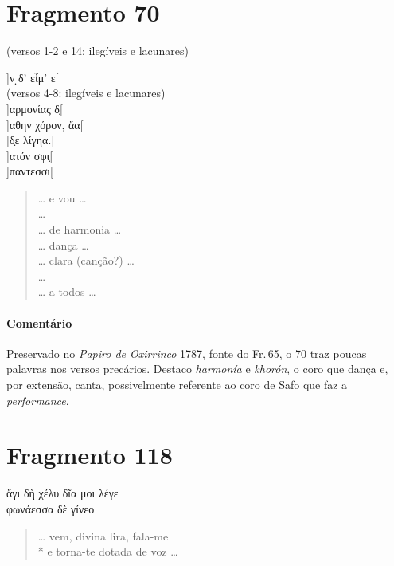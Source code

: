 \section{Fragmento 70}

\begin{gkverse}
\textnormal{(versos 1-2 e 14: ilegíveis e lacunares)}

]ν ̣δ’ εἶμ’ ε[\\
\textnormal{(versos 4-8: ilegíveis e lacunares)}\\
]αρμονίας δ̣[\\
         ]αθην χόρον, ἄα[\\
   ]δ̣ε λίγηα.[\\
   ]ατόν σφι̣[\\
  ]παντεσσι[

\end{gkverse}

\begin{verse}
\ldots{} e vou \ldots{}\\
\ldots{}\\
\ldots{} de harmonia \ldots{}\\
\ldots{} dança \ldots{}\\
\ldots{} clara (canção?) \ldots{}\\
\ldots{}\\
\ldots{} a todos \ldots{} 
\end{verse}


{\paragraph{Comentário} Preservado no \textit{Papiro de Oxirrinco} 1787, fonte do Fr.\,65, o 70 traz poucas palavras nos versos precários. Destaco \textit{harmonía} e \textit{khorón}, o coro que dança e, por extensão, canta, possivelmente referente ao coro de Safo que faz a \textit{performance}.}

\pagebreak
\section{Fragmento 118}

\begin{gkverse}
ἄγι δὴ χέλυ δῖα \dagger{}μοι λέγε\dagger{}\\
φωνάεσσα \dagger{}δὲ γίνεο\dagger{}
\end{gkverse}

\begin{verse}
\ldots{} vem, divina lira, fala-me\\*
e torna-te dotada de voz \ldots{}
\end{verse}


